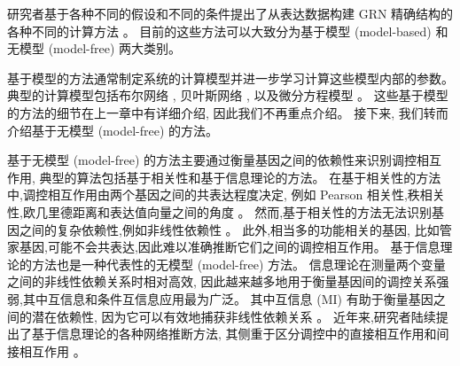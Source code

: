 
研究者基于各种不同的假设和不同的条件提出了从表达数据构建 GRN 精确结构的各种不同的计算方法 。
目前的这些方法可以大致分为基于模型 (model-based) 和无模型 (model-free) 两大类别。

基于模型的方法通常制定系统的计算模型并进一步学习计算这些模型内部的参数。
典型的计算模型包括布尔网络 ,
贝叶斯网络 ,
以及微分方程模型 。
这些基于模型的方法的细节在上一章中有详细介绍, 因此我们不再重点介绍。
接下来, 我们转而介绍基于无模型 (model-free) 的方法。

基于无模型 (model-free) 的方法主要通过衡量基因之间的依赖性来识别调控相互作用,
典型的算法包括基于相关性和基于信息理论的方法。
在基于相关性的方法中,调控相互作用由两个基因之间的共表达程度决定,
例如 Pearson 相关性,秩相关性,欧几里德距离和表达值向量之间的角度 。
然而,基于相关性的方法无法识别基因之间的复杂依赖性,例如非线性依赖性 。
此外,相当多的功能相关的基因, 比如管家基因,可能不会共表达,因此难以准确推断它们之间的调控相互作用。
基于信息理论的方法也是一种代表性的无模型 (model-free) 方法。
信息理论在测量两个变量之间的非线性依赖关系时相对高效, 
因此越来越多地用于衡量基因间的调控关系强弱,其中互信息和条件互信息应用最为广泛。
其中互信息 (MI) 有助于衡量基因之间的潜在依赖性,
因为它可以有效地捕获非线性依赖关系 。
近年来,研究者陆续提出了基于信息理论的各种网络推断方法,
其侧重于区分调控中的直接相互作用和间接相互作用 。

